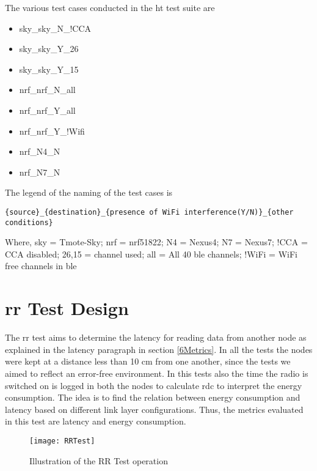 The various test cases conducted in the \gls{ht} test suite are 
\vspace{-5 pt}
\begin{multicols}{2}
\begin{itemize} \itemsep1pt \parskip0pt 
\item sky\_sky\_N\_!CCA
\item sky\_sky\_Y\_26
\item sky\_sky\_Y\_15
\item nrf\_nrf\_N\_all
\item nrf\_nrf\_Y\_all
\item nrf\_nrf\_Y\_!Wifi
\item nrf\_N4\_N
\item nrf\_N7\_N
\end{itemize}
\end{multicols}


The legend of the naming of the test cases is

\texttt{\{source\}\_\{destination\}\_\{presence of WiFi interference(Y/N)\}\_\{other conditions\}}

Where,
sky = Tmote-Sky;	nrf = nrf51822;	N4 = Nexus4; 		N7 = Nexus7;
!CCA = CCA disabled; 26,15 = channel used; all = All 40 \gls{ble}  channels;	!WiFi = WiFi free channels in \gls{ble} 


\section{\acrfull{rr} Test Design} \label{6RRdesign}
The \gls{rr} test aims to determine the latency for reading data from another node as explained in the latency paragraph in section \ref{6Metrics}. In all the tests the nodes were kept at a distance less than 10 cm from one another, since the tests we aimed to reflect an error-free environment. In this tests also the time the radio is switched on is logged in both the nodes to calculate \gls{rdc} to interpret the energy consumption. The idea is to find the relation between energy consumption and latency based on different link layer configurations. Thus, the metrics evaluated in this test are latency and energy consumption.

\begin{figure}[h]
\centering
\texttt{[image: RRTest]}
\caption{Illustration of the RR Test operation}
\label{fig:RRTest}
\end{figure}

